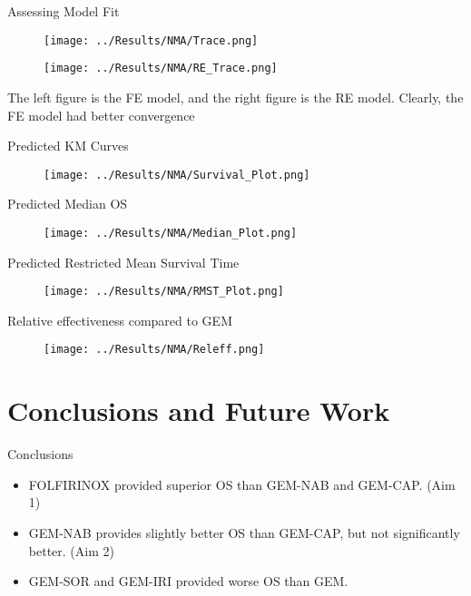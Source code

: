 \documentclass{beamer}
\begin{document}
\begin{frame}{Assessing Model Fit}
\begin{figure}
    \centering
    \begin{minipage}[b]{0.45\textwidth}
        \centering
        \texttt{[image: ../Results/NMA/Trace.png]}
    \end{minipage}
    \hspace{0.05\textwidth}
    \begin{minipage}[b]{0.45\textwidth}
        \centering
        \texttt{[image: ../Results/NMA/RE\_Trace.png]}
    \end{minipage}
\end{figure}

The left figure is the FE model, and the right figure is the RE model. Clearly, the FE model had better convergence
\end{frame}   

\begin{frame}{Predicted KM Curves}
\begin{figure}
    \centering
    \texttt{[image: ../Results/NMA/Survival\_Plot.png]}
\end{figure}
\end{frame}

\begin{frame}{Predicted Median OS}
\begin{figure}
    \centering
    \texttt{[image: ../Results/NMA/Median\_Plot.png]}
\end{figure}
\end{frame}

\begin{frame}{Predicted Restricted Mean Survival Time}
\begin{figure}
    \centering
    \texttt{[image: ../Results/NMA/RMST\_Plot.png]}
\end{figure}
\end{frame}

\begin{frame}{Relative effectiveness compared to GEM}
\begin{figure}
    \centering
    \texttt{[image: ../Results/NMA/Releff.png]}
\end{figure}
\end{frame}

\section{Conclusions and Future Work}
\begin{frame}{Conclusions}
    \begin{itemize}
        \item FOLFIRINOX provided superior OS than GEM-NAB and GEM-CAP. (Aim 1) 
        \pause
        \item GEM-NAB provides slightly better OS than GEM-CAP, but not significantly better. (Aim 2)
        \pause
        \item GEM-SOR and GEM-IRI provided worse OS than GEM. 
    \end{itemize}
\end{frame}
\end{document}
